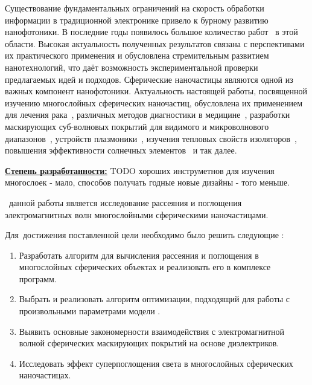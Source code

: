 {\actuality} 
Существование фундаментальных ограничений на скорость обработки
информации в традиционной электронике привело к бурному развитию
нанофотоники. В последние годы появилось большое количество
работ~\cite{Tame-quantum-plasmonics-2013,
  Javier-graphene-plasmonics-2014, Khurgin-loss-plasmonics-2015,
  He-tunable-terahertz-graphene-metamaterials-2015,
  Segal-meta-nonlinar-PhC-2015,
  Poddubny-hyperbolic-metamaterials-2013, Kildishev-metasurface-2013}
в этой области.  Высокая актуальность полученных результатов связана с
перспективами их практического применения и обусловлена стремительным
развитием нанотехнологий, что даёт возможность экспериментальной
проверки предлагаемых идей и подходов. Сферические наночастицы
являются одной из важных компонент нанофотоники. Актуальность
настоящей работы, посвященной изучению многослойных сферических
наночастиц, обусловлена их применением для лечения
рака~\cite{Zhang-2010, Hirsch-2003}, различных методов диагностики в
медицине~\cite{Allain-2002}, разработки маскирующих суб-волновых
покрытий для видимого и микроволнового диапазонов~\cite{Qui-2009,
  Semouchkina-2013}, устройств плазмоники~\cite{Martin-2013,
  Alu-2005}, изучения тепловых свойств изоляторов~\cite{Xie-2013},
повышения эффективности солнечных элементов~\cite{Kameya-2011,
  Mann-2011} и так далее.

\underline{\textbf{Степень разработанности:}} TODO хороших инструметнов для
изучения многослоек - мало, способов получать годные новые дизайны -
того меньше.

\aim\ данной работы является %
исследование рассеяния и поглощения электромагнитных волн многослойными
сферическими наночастицами.

Для~достижения поставленной цели необходимо было решить следующие {\tasks}:
\begin{enumerate}
  \item Разработать алгоритм для вычисления рассеяния и поглощения в
    многослойных сферических объектах и реализовать его в комплексе программ.
  \item Выбрать и реализовать алгоритм оптимизации, подходящий для
    работы с произвольными параметрами модели%
    .
  \item Выявить основные закономерности взаимодействия с
    электромагнитной волной сферических маскирующих покрытий на
    основе диэлектриков.
  \item Исследовать эффект суперпоглощения света в многослойных
    сферических наночастицах.
\end{enumerate}

